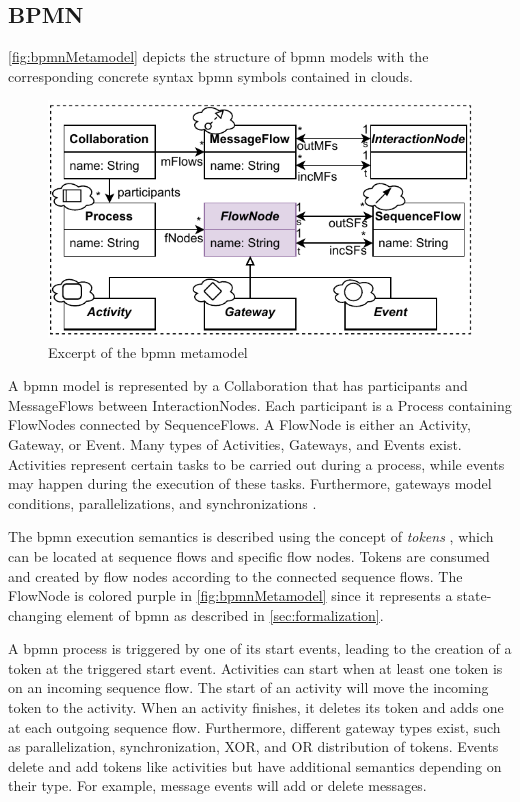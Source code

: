 \documentclass[runningheads]{llncs}
\begin{document}
\subsection{BPMN}
\autoref{fig:bpmnMetamodel} depicts the structure of \gls*{bpmn} models with the corresponding concrete syntax \gls*{bpmn} symbols contained in clouds.

\begin{figure}[ht]
  \centering
  \includegraphics[width=0.7\linewidth]{images/bpmn_semantics-bpmn-metamodel.pdf}
  \caption{Excerpt of the \gls*{bpmn} metamodel \cite{objectmanagementgroupBusinessProcessModel2013}}
  \label{fig:bpmnMetamodel}
\end{figure}

A \gls*{bpmn} model is represented by a \textsf{Collaboration} that has \textsf{participants} and \textsf{MessageFlows} between \textsf{InteractionNodes}.
Each participant is a \textsf{Process} containing \textsf{FlowNodes} connected by \textsf{SequenceFlows}.
A \textsf{FlowNode} is either an \textsf{Activity}, \textsf{Gateway}, or \textsf{Event}.
Many types of \textsf{Activities}, \textsf{Gateways}, and \textsf{Events} exist.
Activities represent certain tasks to be carried out during a process, while events may happen during the execution of these tasks.
Furthermore, gateways model conditions, parallelizations, and synchronizations \cite{freundRealLifeBPMNUsing2019}.

The \gls*{bpmn} execution semantics is described using the concept of \textit{tokens} \cite{objectmanagementgroupBusinessProcessModel2013}, which can be located at sequence flows and specific flow nodes.
Tokens are consumed and created by flow nodes according to the connected sequence flows.
The \textsf{FlowNode} is colored purple in \autoref{fig:bpmnMetamodel} since it represents a state-changing element of \gls*{bpmn} as described in \autoref{sec:formalization}.

A \gls*{bpmn} process is triggered by one of its start events, leading to the creation of a token at the triggered start event.
Activities can start when at least one token is on an incoming sequence flow.
The start of an activity will move the incoming token to the activity.
When an activity finishes, it deletes its token and adds one at each outgoing sequence flow.
Furthermore, different gateway types exist, such as parallelization, synchronization, XOR, and OR distribution of tokens.
Events delete and add tokens like activities but have additional semantics depending on their type.
For example, message events will add or delete messages.
\end{document}

